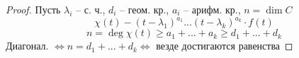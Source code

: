 \begin{proof}
	Пусть $ \lambda_i $ -- с. ч., $ d_i $ -- геом. кр., $ a_i $ -- арифм. кр., $ n = \dim C $
	$$ \chi(t) - (t - \lambda_1)^{a_1} ...(t - \lambda_k)^{a_k} \cdot f(t) $$
	$$ n = \deg \chi(t) \ge a_1 + ... + a_k \ge d_1 + ... + d_k $$
	Диагонал. $ \iff n = d_1 + ... + d_k \iff $ везде достигаются равенства
\end{proof}
